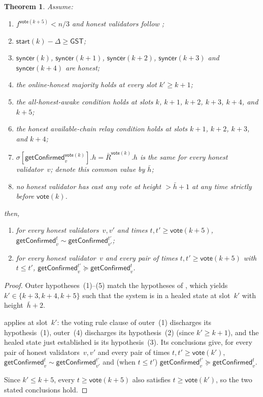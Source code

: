 \documentclass{article}
\newcommand{\syncer}{\mathsf{syncer}}
\newcommand{\start}{\mathsf{start}}
\newcommand{\vote}{\mathsf{vote}}
\newcommand{\comm}[1]{\bar{#1}}
\newcommand{\getConfirmed}{\textsf{getConfirmed}\xspace}
\theoremstyle{plain}
\newtheorem{theorem}{Theorem}
\theoremstyle{definition}
\theoremstyle{remark}
\newcommand{\GST}{\ensuremath{\mathsf{GST}}}
\newcommand{\OHM}{online-honest majority\xspace}
\newcommand{\HAR}{honest available-chain relay\xspace}
\newcommand{\AHA}{all-honest-awake\xspace}
\begin{document}
\begin{theorem}
Assume:
\begin{enumerate}
  \item $f^{\vote(k+5)} < n/3$ and honest validators follow ;
  \item $\start(k) - \Delta \geq \GST$;
  \item $\syncer(k)$, $\syncer(k+1)$, $\syncer(k+2)$, $\syncer(k+3)$ and $\syncer(k+4)$ are honest;
  \item the \OHM holds at every slot $k' \geq k+1$;
  \item the \AHA condition holds at slots $k$, $k+1$, $k+2$, $k+3$, $k+4$, and $k+5$;
  \item the \HAR condition holds at slots $k+1$, $k+2$, $k+3$, and $k+4$;
  \item $\sigma[\getConfirmed_v^{\vote(k)}].h = \comm{R}^{\vote(k)}.h$ is the same for every honest validator~$v$; denote this common value by $\comm{h}$;
  \item no honest validator has cast any vote at height $> \comm{h}+1$ at any time strictly before $\vote(k)$.
\end{enumerate}
then,
\begin{enumerate}
  \item for every honest validators~$v,v'$ and times $t, t' \geq \vote(k+5)$, $\getConfirmed_v^{t} \sim \getConfirmed_{v'}^{t'}$;
  \item for every honest validator~$v$ and every pair of times $t, t' \geq \vote(k+5)$ with $t \leq t'$, $\getConfirmed_v^{t'} \succeq \getConfirmed_v^t$.
\end{enumerate}
\end{theorem}

\begin{proof}
Outer hypotheses~(1)--(5) match the hypotheses of , which yields $k' \in \{k+3, k+4, k+5\}$ such that the system is in a healed state at slot~$k'$ with height~$\comm{h}+2$.

 applies at slot~$k'$: the voting rule clause of outer~(1) discharges its hypothesis~(1), outer~(4) discharges its hypothesis~(2) (since $k' \geq k+1$), and the healed state just established is its hypothesis~(3). Its conclusions give, for every pair of honest validators~$v, v'$ and every pair of times $t, t' \geq \vote(k')$, $\getConfirmed_v^t \sim \getConfirmed_{v'}^{t'}$ and (when $t \leq t'$) $\getConfirmed_v^{t'} \succeq \getConfirmed_v^t$.

Since $k' \leq k+5$, every $t \geq \vote(k+5)$ also satisfies $t \geq \vote(k')$, so the two stated conclusions hold.
\end{proof}
\end{document}
